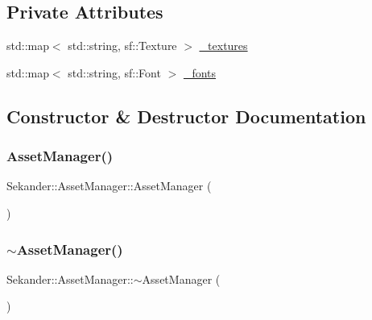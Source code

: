 \subsection*{Private Attributes}
\begin{DoxyCompactItemize}
\item 
std\+::map$<$ std\+::string, sf\+::\+Texture $>$ \hyperlink{classSekander_1_1AssetManager_a8c48606112891dce7f97438ecb5d78cb}{\+\_\+textures}
\item 
std\+::map$<$ std\+::string, sf\+::\+Font $>$ \hyperlink{classSekander_1_1AssetManager_ab9f59df9ccf2272cde52a93690cad9b7}{\+\_\+fonts}
\end{DoxyCompactItemize}


\subsection{Constructor \& Destructor Documentation}
\mbox{\label{classSekander_1_1AssetManager_a5d122bc31351cdf6a844d97351243b1b}} 
\subsubsection{\texorpdfstring{Asset\+Manager()}{AssetManager()}}
{\footnotesize\ttfamily Sekander\+::\+Asset\+Manager\+::\+Asset\+Manager (\begin{DoxyParamCaption}{ }\end{DoxyParamCaption})\hspace{0.3cm}{\ttfamily [inline]}}

\mbox{\label{classSekander_1_1AssetManager_a471be342805da815a3de41b72ed6a763}} 
\subsubsection{\texorpdfstring{$\sim$\+Asset\+Manager()}{~AssetManager()}}
{\footnotesize\ttfamily Sekander\+::\+Asset\+Manager\+::$\sim$\+Asset\+Manager (\begin{DoxyParamCaption}{ }\end{DoxyParamCaption})\hspace{0.3cm}{\ttfamily [inline]}}




